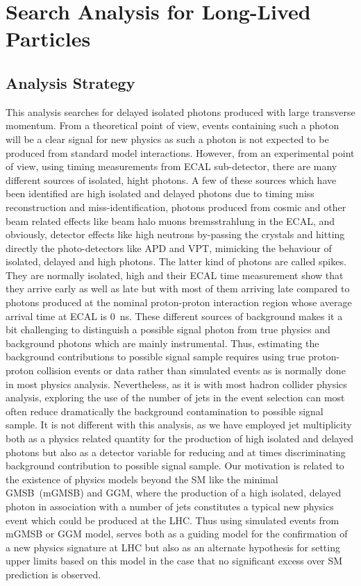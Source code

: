 \chapter{Search Analysis for Long-Lived Particles }
\section{Analysis Strategy}
This analysis searches for delayed isolated photons produced with large transverse momentum. From a theoretical point of view, events containing such a photon will be a clear signal for new physics as such a photon is not expected to be produced from standard model interactions. However, from an experimental point of view, using  timing measurements from  ECAL sub-detector, there are many different sources of isolated, hight \pt photons. A few of these sources which have been identified are high \pt isolated and delayed photons due to timing miss reconstruction and miss-identification, photons produced from cosmic and other beam related effects like beam halo muons bremsstrahlung in the ECAL, and obviously, detector effects like high \pt neutrons by-passing the crystals and hitting directly the photo-detectors like APD and VPT, mimicking the behaviour of isolated, delayed and high \pt photons. The latter kind of photons are called spikes. They are normally isolated, high \pt and their ECAL time measurement show that they arrive early as well as late but with most of them arriving late compared to photons produced at the nominal proton-proton interaction region whose average arrival time at ECAL is 0~ns. These different sources of background makes it a bit challenging to distinguish a possible signal photon from true physics and background photons which are mainly instrumental.
Thus, estimating the background contributions to possible signal sample requires using true proton-proton collision events or data rather than simulated events as is normally done in most physics  analysis. 
Nevertheless, as it is with most hadron collider physics analysis, exploring the use of the number of jets in the event selection can most often reduce dramatically the background contamination to possible signal sample. It is not different with this analysis, as we have employed jet multiplicity both as a physics related quantity for the production of high \pt isolated and delayed photons but also as a detector variable for reducing and at times discriminating  background contribution to possible signal sample.
Our motivation is related to the existence of physics models beyond the SM like the minimal GMSB~(mGMSB) and GGM, where the production of a high \pt isolated, delayed photon in association  with a number of jets constitutes a typical new physics event  which could be produced at the LHC.
Thus using simulated events from mGMSB or GGM model, serves both as a guiding model for the confirmation of a new physics signature at LHC but also as an alternate hypothesis for setting upper limits based on this model in the case that no significant excess over SM prediction is observed.


